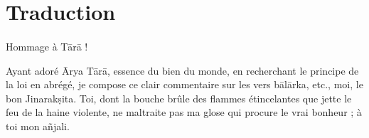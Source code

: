 \documentclass[a4paper, 11pt, oneside, french, landscape, twocolumn]{article}
\begin{document}
\section{Traduction}
\paragraph{}
Hommage à T\={a}r\={a} !

\bigskip

Ayant adoré \={A}rya T\={a}r\={a}, essence du bien du monde, en recherchant le principe de la loi en abrégé, je compose ce clair commentaire sur les vers b\={a}l\={a}rka, etc., moi, le bon Jinarak\d{s}ita. Toi, dont la bouche brûle des flammes étincelantes que jette le feu de la haine violente, ne maltraite pas ma glose qui procure le vrai bonheur ; à toi mon a\~{n}jali.
\end{document}
